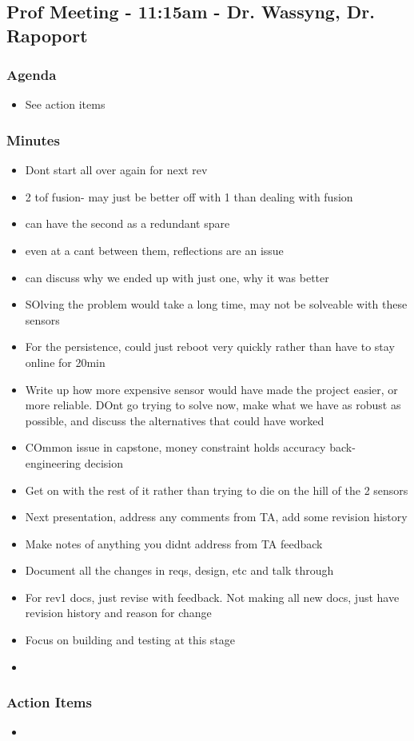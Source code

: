 	\subsection*{Prof Meeting - 11:15am - Dr. Wassyng, Dr. Rapoport}
		\subsubsection*{Agenda}
			\begin{itemize}
				\item See action items
			\end{itemize}

		\subsubsection*{Minutes}
			\begin{itemize}
				\item Dont start all over again for next rev 
				\item 2 tof fusion- may just be better off with 1 than dealing with fusion
				\item can have the second as a redundant spare 
				\item even at a cant between them, reflections are an issue
				\item can discuss why we ended up with just one, why it was better 
				\item SOlving the problem would take a long time, may not be solveable with these sensors 
				\item For the persistence, could just reboot very quickly rather than have to stay online for 20min
				\item Write up how more expensive sensor would have made the project easier, or more reliable. DOnt go trying to solve now, make what we have as robust as possible, and discuss the alternatives that could have worked
				\item COmmon issue in capstone, money constraint holds accuracy back- engineering decision
				\item Get on with the rest of it rather than trying to die on the hill of the 2 sensors 
				\item Next presentation, address any comments from TA, add some revision history 
				\item Make notes of anything you didnt address from TA feedback 
				\item Document all the changes in reqs, design, etc and talk through 
				\item For rev1 docs, just revise with feedback. Not making all new docs, just have revision history and reason for change 
				\item Focus on building and testing at this stage
				\item 
			\end{itemize}

		\subsubsection*{Action Items}
			\begin{itemize}
				\item 
			\end{itemize}

